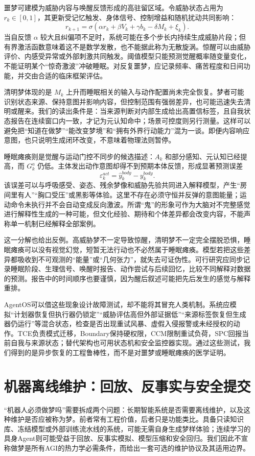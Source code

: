 噩梦可建模为威胁内容与唤醒反馈形成的高驻留区域。令威胁状态占用为 $r_k\in[0,1]$，其更新受记忆触发、身体信号、控制增益和随机扰动共同影响：
\[
r_{k+1}=\sigma(\alpha r_k+\beta V_k+\gamma b_k-\delta M_k+\xi_k).
\]
当自反馈 $\alpha$ 较大且纠偏项不足时，系统可能在多个步长内持续生成威胁片段；但有界激活函数意味着这不是数学发散，也不能据此称为无散旋涡。惊醒可以由威胁评价、内感受异常或外部刺激共同触发。阈值模型只能预测觉醒概率随变量变化，不能证明某个“惊奇激波”冲破睡眠。对反复噩梦，应记录频率、痛苦程度和日间功能，并交由合适的临床框架评估。

清明梦体现的是 $M_k$ 上升而睡眠相关的输入与动作配置尚未完全恢复。梦者可能识别状态来源、保持意图并影响内容，但控制范围有强弱差异，也可能迅速失去清明或醒来。我们的读出条件是：当来源判断对内部生成给出高置信标签，且自我状态报告在连续窗口内一致，才记为元认知命中；场景可控度则另行测量。这样可以避免把“知道在做梦”“能改变梦境”和“拥有外界行动能力”混为一谈。即便内容响应意图，也只说明生成闭环改变，不意味着物理法则暂停。

睡眠瘫痪则是觉醒与运动门控不同步的候选描述：$A_k$ 和部分感知、元认知已经提高，而 $G^a_k$ 仍低。主体发出动作意图却得不到预期本体反馈，形成显著预测误差
\[
\varepsilon_k^{act}=\widehat y_k^{body}-y_k^{body}.
\]
该误差可以与呼吸感受、姿态、残余梦像和威胁先验共同进入解释模型，产生“房间里有人”“胸口受压”或黑影等体验。这里不存在必须守恒并反弹的意图能量；运动命令未执行并不会自动变成反向激波。所谓“鬼”的形象可作为大脑对不完整感觉进行解释性生成的一种可能，但文化经验、期待和个体差异都会改变内容，不能声称单一机制已经解释全部案例。

这一分解也给出反例。高威胁梦不一定导致惊醒，清明梦不一定完全摆脱恐惧，睡眠瘫痪可以没有视觉幻觉，短暂无法行动也不必然属于睡眠瘫痪。模型若把这些差异都吸收到不可观测的“能量”或“几何张力”，就失去可证伪性。可行研究应同步记录睡眠阶段、生理信号、唤醒时报告、动作尝试与后续回忆，比较不同解释对数据的预测。报告中的时间顺序也要谨慎，因为醒后叙述可能把先后发生的感觉与解释重排。

AgentOS可以借这些现象设计故障测试，却不能将其冒充人类机制。系统应模拟“计划器恢复但执行器仍锁定”“威胁评估高但外部证据低”“来源标签恢复但生成器仍运行”等混合状态，检查是否出现重试风暴、虚假入侵报警或未经授权的动作。TCE负责模式迁移，Boundary保持硬权限，CCM限制重试负荷，SPC回报当前自我与来源状态；替代架构也可用状态机和安全监控器实现。通过这些测试，我们得到的是异步恢复的工程鲁棒性，而不是对噩梦或睡眠瘫痪的医学证明。

\section{机器离线维护：回放、反事实与安全提交}
\label{sec:robot_dreaming}
“机器人必须做梦吗”需要拆成两个问题：长期智能系统是否需要离线维护，以及这种维护是否应被称为梦。前者常有工程价值，后者只是功能类比。具备只读知识库、冻结模型或外部训练流水线的系统，可能无需自身生成梦样体验；连续学习的具身Agent则可能受益于回放、反事实模拟、模型压缩和安全回归。我们因此不宣称做梦是所有AGI的热力学必需条件，而给出一套可选的维护协议及其适用边界。

